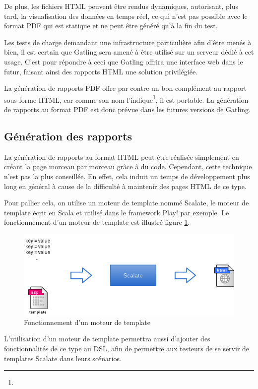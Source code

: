 De plus, les fichiers HTML peuvent être rendus dynamiques, autorisant, plus tard, la visualisation des données en temps réel, ce qui n'est pas possible avec le format PDF qui est statique et ne peut être généré qu'à la fin du test.

Les tests de charge demandant une infrastructure particulière afin d'être menés à bien, il est certain que Gatling sera amené à être utilisé sur un serveur dédié à cet usage. C'est pour répondre à ceci que Gatling offrira une interface web dans le futur, faisant ainsi des rapports HTML une solution privilégiée.

La génération de rapports PDF offre par contre un bon complément au rapport sous forme HTML, car comme son nom l'indique\footnote{}, il est portable. La génération de rapports au format PDF est donc prévue dans les futures versions de Gatling.

\subsection{Génération des rapports}
\label{sec_scalate}

La génération de rapports au format HTML peut être réalisée simplement en créant la page morceau par morceau grâce à du code. Cependant, cette technique n'est pas la plus conseillée. En effet, cela induit un temps de développement plus long en général à cause de la difficulté à maintenir des pages HTML de ce type.

Pour pallier cela, on utilise un moteur de template nommé Scalate, le moteur de template écrit en Scala et utilisé dans le framework Play! par exemple. Le fonctionnement d'un moteur de template est illustré figure \ref{scalate}.

\begin{figure}[h]
\begin{center}
\includegraphics[width=400pt]{img/scalate.png}
\end{center}
\caption{Fonctionnement d'un moteur de template}
\label{scalate}
\end{figure}

L'utilisation d'un moteur de template permettra aussi d'ajouter des fonctionnalités de ce type au DSL, afin de permettre aux testeurs de se servir de templates Scalate dans leurs scénarios.